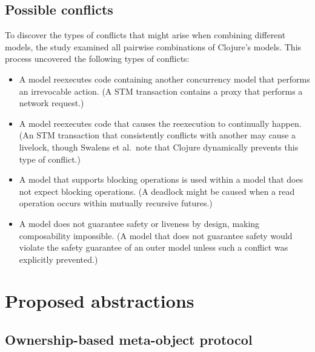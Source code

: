 \documentclass{sig-alternate}
\begin{document}
\subsection{Possible conflicts}

To discover the types of conflicts that might arise when combining different models, the study examined all pairwise combinations of Clojure's models. This process uncovered the following types of conflicts:

\begin{itemize}
  \item A model reexecutes code containing another concurrency model that performs an irrevocable action. (A STM transaction contains a proxy that performs a network request.)

  \item A model reexecutes code that causes the reexecution to continually happen. (An STM transaction that consistently conflicts with another may cause a livelock, though Swalens et al.~note that Clojure dynamically prevents this type of conflict.)

  \item A model that supports blocking operations is used within a model that does not expect blocking operations. (A deadlock might be caused when a read operation occurs within mutually recursive futures.)

  \item A model does not guarantee safety or liveness by design, making composability impossible. (A model that does not guarantee safety would violate the safety guarantee of an outer model unless such a conflict was explicitly prevented.)
\end{itemize}

\section{Proposed abstractions}



\subsection{Ownership-based meta-object protocol}
\end{document}
